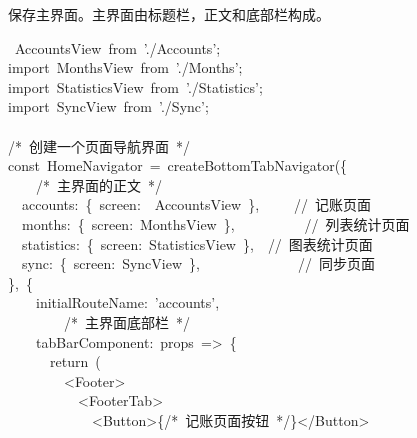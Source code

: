 \documentclass{article}
\begin{document}
\noindent{}保存主界面。主界面由标题栏，正文和底部栏构成。%
\begin{mdpre}%
~AccountsView~{from}~{'}{./Accounts}{'};\\
{import}~MonthsView~{from}~{'}{./Months}{'};\\
{import}~StatisticsView~{from}~{'}{./Statistics}{'};\\
{import}~SyncView~{from}~{'}{./Sync}{'};\\
\\
{/*}{~创建一个页面导航界面~}{*/}\\
{const}~HomeNavigator~=~createBottomTabNavigator(\{\\
~~~~{/*}{~主界面的正文~}{*/}\\
~~accounts:~\{~screen:~~AccountsView~\},~~~~~{//~记账页面}\\
~~months:~\{~screen:~MonthsView~\},~~~~~~~~~~{//~列表统计页面}\\
~~statistics:~\{~screen:~StatisticsView~\},~~{//~图表统计页面}\\
~~sync:~\{~screen:~SyncView~\},~~~~~~~~~~~~~~{//~同步页面}\\
\},~\{\\
~~~~initialRouteName:~{'}{accounts}{'},\\
~~~~~~~~{/*}{~主界面底部栏~}{*/}\\
~~~~tabBarComponent:~props~=\textgreater{}~\{\\
~~~~~~{return}~(\\
~~~~~~~~\textless{}Footer\textgreater{}\\
~~~~~~~~~~\textless{}FooterTab\textgreater{}\\
~~~~~~~~~~~~\textless{}Button\textgreater{}\{{/*}{~记账页面按钮~}{*/}\}\textless{}/Button\textgreater{}\\

\end{mdpre}
\end{document}
